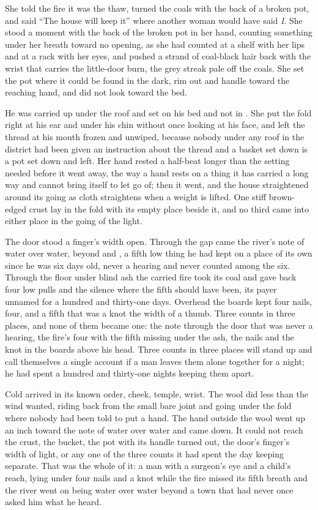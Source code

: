 She told the fire it was the thaw, turned the coals with the back of a broken pot, and said “The house will keep it” where another woman would have said \emph{I}. She stood a moment with the back of the broken pot in her hand, counting something under her breath toward no opening, as she had counted at a shelf with her lips and at a rack with her eyes, and pushed a strand of coal-black hair back with the wrist that carries the little-door burn, the grey streak pale off the coals. She set the pot where it could be found in the dark, rim out and handle toward the reaching hand, and did not look toward the bed.

He was carried up under the roof and set on his bed and not in . She put the fold right at his ear and under his chin without once looking at his face, and left the thread at his mouth frozen and unwiped, because nobody under any roof in the district had been given an instruction about the thread and a basket set down is a pot set down and left. Her hand rested a half-beat longer than the setting needed before it went away, the way a hand rests on a thing it has carried a long way and cannot bring itself to let go of; then it went, and the house straightened around its going as cloth straightens when a weight is lifted. One stiff brown-edged crust lay in the fold with its empty place beside it, and no third came into either place in the going of the light.

The door stood a finger's width open. Through the gap came the river's note of water over water, beyond  and , a fifth low thing he had kept on a place of its own since he was six days old, never a hearing and never counted among the six. Through the floor under blind ash the carried fire took its coal and gave back four low pulls and the silence where the fifth should have been, its payer unnamed for a hundred and thirty-one days. Overhead the boards kept four nails, four, and a fifth that was a knot the width of a thumb. Three counts in three places, and none of them became one: the note through the door that was never a hearing, the fire's four with the fifth missing under the ash, the nails and the knot in the boards above his head. Three counts in three places will stand up and call themselves a single account if a man leaves them alone together for a night; he had spent a hundred and thirty-one nights keeping them apart.

Cold arrived in its known order, cheek, temple, wrist. The wool did less than the wind wanted, riding back from the small bare joint and going under the fold where nobody had been told to put a hand. The hand outside the wool went up an inch toward the note of water over water and came down. It could not reach the crust, the bucket, the pot with its handle turned out, the door's finger's width of light, or any one of the three counts it had spent the day keeping separate. That was the whole of it: a man with a surgeon's eye and a child's reach, lying under four nails and a knot while the fire missed its fifth breath and the river went on being water over water beyond a town that had never once asked him what he heard.

